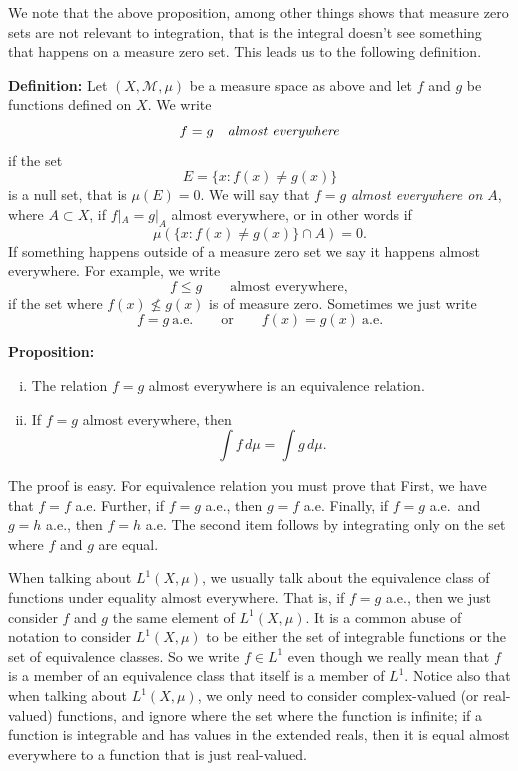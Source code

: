 \documentclass[12pt]{book}
\newcommand{\sM}{{\mathcal{M}}}
\theoremstyle{plain}
\theoremstyle{remark}
\theoremstyle{definition}
\theoremstyle{exercise}
\theoremstyle{example}
\begin{document}
\medskip

We note that the above proposition, among other things shows that 
measure zero sets are not relevant to integration, that is the integral
doesn't see something that happens on a measure zero set.
This leads us to the following definition.

\medskip

\textbf{Definition:}
Let $(X,\sM,\mu)$ be a measure space as above and
let $f$ and $g$ be functions defined on $X$.  We write
$$
f = g \quad \text{\emph{almost everywhere}}
$$
if the set
$$
E = \{ x : f(x) \not= g(x) \}
$$
is a null set, that is $\mu(E) = 0$.  We will say that
$f = g$ \emph{almost everywhere on $A$}, where $A \subset X$, if $f|_A = g|_A$
almost everywhere, or in other words if
$$
\mu (\{ x : f(x) \not= g(x) \} \cap A) = 0 .
$$
If something happens outside of a measure zero set we
say it happens almost everywhere.  For example, we write
$$
f \leq g \qquad \text{almost everywhere},
$$
if the set where $f(x) \not\leq g(x)$ is of measure zero.
Sometimes we just write
$$
f = g ~ \text{a.e.} \qquad \text{or} \qquad
f(x) = g(x) ~ \text{a.e.}
$$

\medskip

\textbf{Proposition:}
\begin{enumerate}[(i)]
\item
The relation $f = g$ almost everywhere is an equivalence relation.
\item
If $f = g$ almost everywhere, then
$$
\int f \, d\mu = \int g \, d\mu .
$$
\end{enumerate}

\medskip

The proof is easy.  For equivalence relation you must prove that
First, we have that $f = f$ a.e.  Further,
if $f = g$ a.e., then $g = f$ a.e.  Finally, if $f = g$ a.e.\ and $g = h$
a.e.,
then $f = h$ a.e.
The second item follows by integrating only on the set where
$f$ and $g$ are equal.

\medskip

When talking about $L^1(X,\mu)$, we usually talk about the equivalence
class of functions under equality almost everywhere.  That is, if $f=g$ a.e., then
we just consider $f$ and $g$ the same element of $L^1(X,\mu)$.
It is a common abuse of notation to consider $L^1(X,\mu)$ to be
either the set of integrable functions or the set of equivalence classes.
So we write $f \in L^1$ even though we really mean that $f$ is a member of
an equivalence class that itself is a member of $L^1$.
Notice also that when talking about $L^1(X,\mu)$, we only need
to consider complex-valued (or real-valued) functions, and ignore where the set
where the function is infinite; if a function is integrable and has values
in the extended reals, then it is equal almost everywhere to a function
that is just real-valued.
\end{document}
